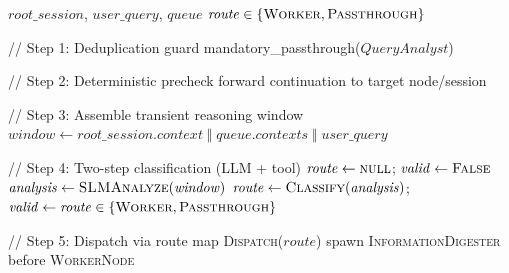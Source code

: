 \documentclass{article}
\begin{document}
\begin{algorithm}[t]
\caption{TINYCUA Query Analyst}
\label{alg:query-analyst}
\begin{algorithmic}[1]
\Require $\mathit{root\_session}$, $\mathit{user\_query}$, $\mathit{queue}$
\Ensure $\mathit{route} \in \{\textsc{Worker}, \textsc{Passthrough}\}$

// Step 1: Deduplication guard
    \State \Return mandatory\_passthrough($\mathit{QueryAnalyst}$)
\EndIf

// Step 2: Deterministic precheck
    \State forward continuation to target node/session
    \State \Return
\EndIf

// Step 3: Assemble transient reasoning window
\State $\mathit{window} \gets \mathit{root\_session}.\mathit{context} \;\Vert\; \mathit{queue}.\mathit{contexts} \;\Vert\; \mathit{user\_query}$

// Step 4: Two-step classification (LLM + tool)
\State $\mathit{route} \gets \textsc{null}$; $\mathit{valid} \gets \textsc{False}$
    \State $\mathit{analysis} \gets \textsc{SLMAnalyze}(\mathit{window})$
    \State $\mathit{route} \gets \textsc{Classify}(\mathit{analysis})$; $\mathit{valid} \gets \mathit{route} \in \{\textsc{Worker}, \textsc{Passthrough}\}$
\EndWhile

// Step 5: Dispatch via route map
\State \textsc{Dispatch}($\mathit{route}$)
    \State spawn \textsc{InformationDigester} before \textsc{WorkerNode}
\EndIf

\end{algorithmic}
\end{algorithm}
\end{document}
